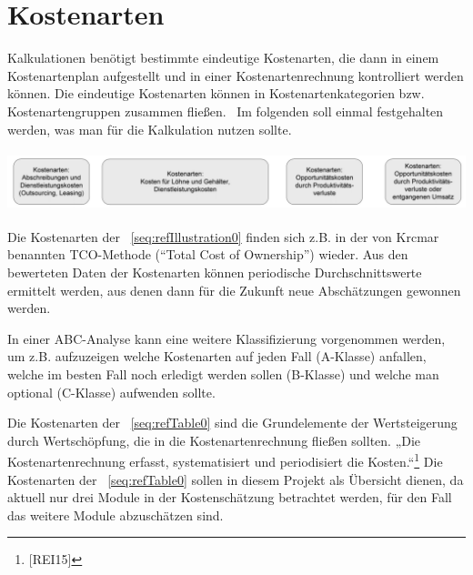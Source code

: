 \documentclass[a4paper]{article}
\title{}
\makeatletter
\newcommand\captionof[1]{\def\@captype{#1}\caption}
\makeatother
\begin{document}
\setcounter{tocdepth}{4}
\renewcommand\contentsname{Inhaltsverzeichnis}
\tableofcontents
\section*{}
\clearpage\section{Kostenarten}
\label{bkm:RefHeading24765162299686}
\bigskip

{\sffamily
Kalkulationen benötigt bestimmte eindeutige Kostenarten, die dann in einem Kostenartenplan aufgestellt und in einer
Kostenartenrechnung kontrolliert werden können. Die eindeutige Kostenarten können in Kostenartenkategorien bzw.
Kostenartengruppen zusammen fließen. \ Im folgenden soll einmal festgehalten werden, was man für die Kalkulation nutzen
sollte.}

{\centering \includegraphics[width=15.455cm,height=1.75cm]{INMAusarbeitung02-img001.png}
\captionof{figure}[Beispiel von Kostenarten in der TCO{}-Methode (Hansen 2009)]{Beispiel von Kostenarten in der
TCO-Methode \textcolor{red}{(Hansen 2009)}}
\label{seq:refIllustration0}
\par}
{\sffamily
Die Kostenarten der \figurename~\ref{seq:refIllustration0} finden sich z.B. in der von Krcmar benannten TCO-Methode
(“Total Cost of Ownership”) wieder. Aus den bewerteten Daten der Kostenarten können periodische Durchschnittswerte
ermittelt werden, aus denen dann für die Zukunft neue Abschätzungen gewonnen werden.}

{\sffamily
In einer ABC-Analyse kann eine weitere Klassifizierung vorgenommen werden, um z.B. aufzuzeigen welche Kostenarten auf
jeden Fall (A-Klasse) anfallen, welche im besten Fall noch erledigt werden sollen (B-Klasse) und welche man optional
(C-Klasse) aufwenden sollte.}


\bigskip

{\sffamily
Die Kostenarten der \tablename~\ref{seq:refTable0} sind die Grundelemente der Wertsteigerung durch Wertschöpfung, die in
die Kostenartenrechnung fließen sollten. „Die Kostenartenrechnung erfasst, systematisiert und periodisiert die
Kosten.“\footnote{[REI15]} Die Kostenarten der \tablename~\ref{seq:refTable0} sollen in diesem Projekt als Übersicht
dienen, da aktuell nur drei Module in der Kostenschätzung betrachtet werden, für den Fall das weitere Module
abzuschätzen sind.}
\end{document}
